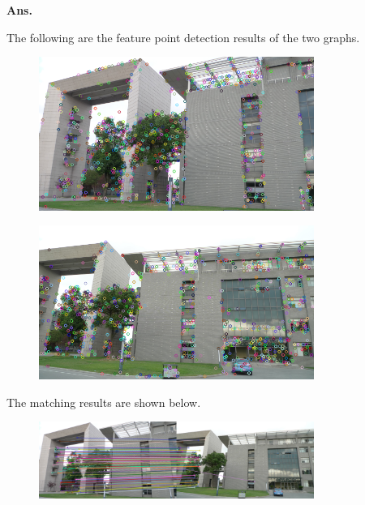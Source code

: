 \documentclass[12pt, a4paper, UTF8, fontset=windows]{ctexbook}
\newenvironment{solution}{\par\noindent\textbf{Ans.}}{\par}
\begin{document}
\begin{solution}

    The following are the feature point detection results of the two graphs.

    \begin{figure}[H]
        \centering
        \includegraphics[width=0.8\textwidth]{../code/Q5/src/result/sse1_keypoints.png}
        \label{fig:Q5_1}
    \end{figure}

    \begin{figure}[H]
        \centering
        \includegraphics[width=0.8\textwidth]{../code/Q5/src/result/sse2_keypoints.png}
        \label{fig:Q5_2}
    \end{figure}

    The matching results are shown below.

    \begin{figure}[H]
        \centering
        \includegraphics[width=0.8\textwidth]{../code/Q5/src/result/sse1_matches.png}
        \label{fig:Q5_3}
    \end{figure}


\end{solution}
\end{document}
